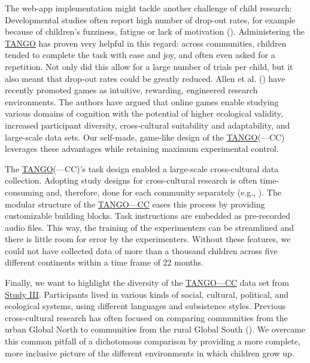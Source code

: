 \documentclass[
]{scrbook}
\begin{document}
The web-app implementation might tackle another challenge of child research: Developmental studies often report high number of drop-out rates, for example because of children's fuzziness, fatigue or lack of motivation (). Administering the \hyperref[acronyms_TANGO]{TANGO} has proven very helpful in this regard: across communities, children tended to complete the task with ease and joy, and often even asked for a repetition. Not only did this allow for a large number of trials per child, but it also meant that drop-out rates could be greatly reduced. Allen et al. () have recently promoted games as intuitive, rewarding, engineered research environments. The authors have argued that online games enable studying various domains of cognition with the potential of higher ecological validity, increased participant diversity, cross-cultural suitability and adaptability, and large-scale data sets. Our self-made, game-like design of the \hyperref[acronyms_TANGO]{TANGO}(---CC) leverages these advantages while retaining maximum experimental control.

The \hyperref[acronyms_TANGO]{TANGO}(---CC)'s task design enabled a large-scale cross-cultural data collection. Adopting study designs for cross-cultural research is often time-consuming and, therefore, done for each community separately (e.g., ). The modular structure of the \hyperref[acronyms_TANGOux2014CC]{TANGO---CC} eases this process by providing customizable building blocks. Task instructions are embedded as pre-recorded audio files. This way, the training of the experimenters can be streamlined and there is little room for error by the experimenters. Without these features, we could not have collected data of more than a thousand children across five different continents within a time frame of 22 months.

Finally, we want to highlight the diversity of the \hyperref[acronyms_TANGOux2014CC]{TANGO---CC} data set from \hyperref[studyIII]{Study III}. Participants lived in various kinds of social, cultural, political, and ecological systems, using different languages and subsistence styles. Previous cross-cultural research has often focused on comparing communities from the urban Global North to communities from the rural Global South (). We overcame this common pitfall of a dichotomous comparison by providing a more complete, more inclusive picture of the different environments in which children grow up.
\end{document}
